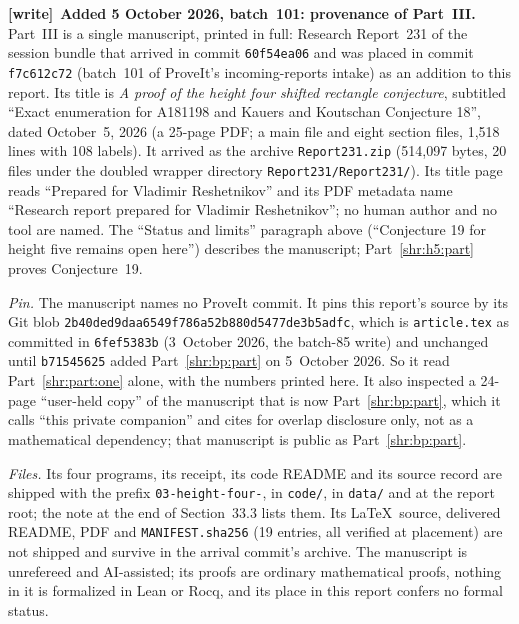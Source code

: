 \documentclass[11pt,letterpaper]{article}
\numberwithin{equation}{section}
\theoremstyle{definition}
\newcommand{\1}{\mathbf 1}
\newenvironment{writenote}[1][]{\par\smallskip\begingroup\small
 \noindent\textbf{[write]}\if\relax\detokenize{#1}\relax\else~\textbf{#1.}\fi\ }%
 {\par\endgroup\smallskip}
\begin{document}
\begin{writenote}[Added 5 October 2026, batch~101: provenance of Part~III]
Part~III is a single manuscript, printed in full: Research Report~231 of
the session bundle that arrived in commit \texttt{60f54ea06} and was placed
in commit \texttt{f7c612c72} (batch~101 of ProveIt's incoming-reports
intake) as an addition to this report. Its title is \emph{A proof of the
height four shifted rectangle conjecture}, subtitled ``Exact enumeration for
A181198 and Kauers and Koutschan Conjecture 18'', dated October~5, 2026 (a
25-page PDF; a main file and eight section files, 1{,}518 lines with 108
labels). It arrived as the archive \texttt{Report231.zip} (514{,}097 bytes,
20 files under the doubled wrapper directory
\texttt{Report231/\allowbreak Report231/}). Its title page reads ``Prepared
for Vladimir Reshetnikov'' and its PDF metadata name ``Research report
prepared for Vladimir Reshetnikov''; no human author and no tool are named.
The ``Status and limits'' paragraph above (``Conjecture 19 for height five
remains open here'') describes the manuscript; Part~\ref{shr:h5:part} proves
Conjecture~19.

\emph{Pin.} The manuscript names no ProveIt commit. It pins this report's
source by its Git blob \texttt{2b40ded9\allowbreak daa6549f\allowbreak 786a52b8\allowbreak 80d5477d\allowbreak e3b5adfc},
which is \texttt{article.tex} as committed in \texttt{6fef5383b}
(3~October 2026, the batch-85 write) and unchanged until
\texttt{b71545625} added Part~\ref{shr:bp:part} on 5~October 2026. So it
read Part~\ref{shr:part:one} alone, with the numbers printed here. It also
inspected a 24-page ``user-held copy'' of the manuscript that is now
Part~\ref{shr:bp:part}, which it calls ``this private companion'' and cites
for overlap disclosure only, not as a mathematical dependency; that
manuscript is public as Part~\ref{shr:bp:part}.

\emph{Files.} Its four programs, its receipt, its code README and its
source record are shipped with the prefix \texttt{03-height-four-}, in
\texttt{code/}, in \texttt{data/} and at the report root; the note at the
end of Section~33.3 lists them. Its
\LaTeX\ source, delivered README, PDF and \texttt{MANIFEST.sha256} (19
entries, all verified at placement) are not shipped and survive in the
arrival commit's archive. The manuscript is unrefereed and AI-assisted; its
proofs are ordinary mathematical proofs, nothing in it is formalized in
Lean or Rocq, and its place in this report confers no formal status.


\end{writenote}
\end{document}
